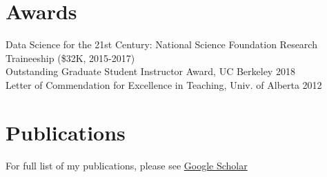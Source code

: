 \documentclass[]{deedy-resume-openfont}
\begin{document}
\begin{minipage}[t]{0.32\textwidth}

\section{Awards}

\textbullet{} Data Science for the 21st Century: National Science Foundation Research Traineeship (\$32K, 2015-2017) \\
\textbullet{} Outstanding Graduate Student Instructor Award, UC Berkeley 2018\\
\textbullet{} Letter of Commendation for Excellence in Teaching, Univ. of Alberta 2012\\
\sectionsep

\section{Publications}
For full list of my publications, please see \href{https://scholar.google.com/citations?user=0BKLXCUAAAAJ}{Google Scholar \faGraduationCap} 

%
%

\end{minipage} 
\hfill
\end{document}
